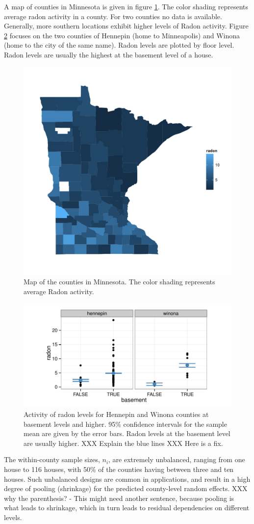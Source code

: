 \documentclass[12pt]{article} %
\newcommand{\hh}[1]{{\color{orange} #1}}
\newcommand{\al}[1]{{\color{red} #1}}
\begin{document}
A map of counties in Minnesota is given in figure \ref{fig:map}. The color shading represents average radon activity in a county. For two counties no data is available. Generally, more southern locations exhibit higher  levels of Radon activity. Figure \ref{fig:tc} focuses on the two counties of Hennepin (home to Minneapolis) and Winona (home to the city of the same name). Radon levels are plotted by floor level. Radon levels are usually the highest at the basement level of a house. 
%
\begin{figure}[htb]
\centering
\includegraphics[width=0.5\linewidth]{figures/map.pdf}
\caption{\label{fig:map} Map of the counties in Minnesota. The color shading represents average Radon activity.}
\end{figure}
%
\begin{figure}[htb]
\centering
\includegraphics[width=0.7\linewidth]{figures/radon-twocounties.pdf}
\caption{\label{fig:tc} Activity of radon levels for Hennepin and Winona counties at basement levels and higher. 95\% confidence intervals for the sample mean are given by the error bars. Radon levels at the basement level are usually higher. \hh{XXX Explain the blue lines} \al{XXX Here is a fix.}}
\end{figure}
%
The within-county sample sizes, $n_i$, are extremely unbalanced, ranging from one house to 116 houses, with 50\% of the counties having between three and ten houses. Such unbalanced designs are common in applications, and result in a high degree of pooling \al{(shrinkage)} for the predicted county-level random effects. \hh{XXX why the parenthesis? - This might need another sentence, because pooling is what leads to shrinkage, which in turn leads to residual dependencies on different levels.}
\end{document}
